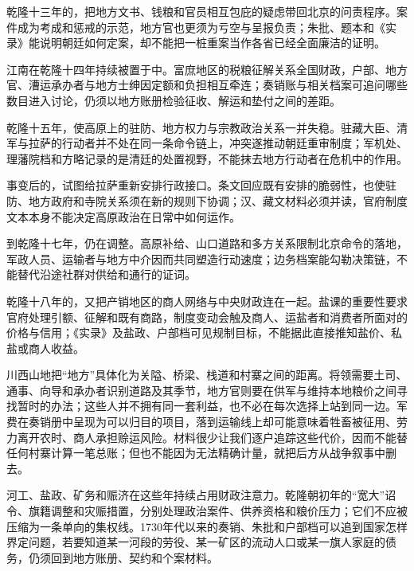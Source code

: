 乾隆十三年的，把地方文书、钱粮和官员相互包庇的疑虑带回北京的问责程序。案件成为考成和惩戒的示范，地方官也更须为亏空与呈报负责；朱批、题本和《实录》能说明朝廷如何定案，却不能把一桩重案当作各省已经全面廉洁的证明。

江南在乾隆十四年持续被置于中。富庶地区的税粮征解关系全国财政，户部、地方官、漕运承办者与地方士绅因定额和负担相互牵连；奏销账与相关档案可追问哪些数目进入讨论，仍须以地方账册检验征收、解运和垫付之间的差距。

乾隆十五年，使高原上的驻防、地方权力与宗教政治关系一并失稳。驻藏大臣、清军与拉萨的行动者并不处在同一条命令链上，冲突遂推动朝廷重审制度；军机处、理藩院档和方略记录的是清廷的处置视野，不能抹去地方行动者在危机中的作用。

事变后的，试图给拉萨重新安排行政接口。条文回应既有安排的脆弱性，也使驻防、地方政府和寺院关系须在新的规则下协调；汉、藏文材料必须并读，官府制度文本本身不能决定高原政治在日常中如何运作。

到乾隆十七年，仍在调整。高原补给、山口道路和多方关系限制北京命令的落地，军政人员、运输者与地方中介因而共同塑造行动速度；边务档案能勾勒决策链，不能替代沿途社群对供给和通行的证词。

乾隆十八年的，又把产销地区的商人网络与中央财政连在一起。盐课的重要性要求官府处理引额、征解和既有商路，制度变动会触及商人、运盐者和消费者所面对的价格与信用；《实录》及盐政、户部档可见规制目标，不能据此直接推知盐价、私盐或商人收益。

川西山地把“地方”具体化为关隘、桥梁、栈道和村寨之间的距离。将领需要土司、通事、向导和承办者识别道路及其季节，地方官则要在供军与维持本地粮价之间寻找暂时的办法；这些人并不拥有同一套利益，也不必在每次选择上站到同一边。军费在奏销册中呈现为可以归目的项目，落到运输线上却可能意味着牲畜被征用、劳力离开农时、商人承担赊运风险。材料很少让我们逐户追踪这些代价，因而不能替任何村寨计算一笔总账；但也不能因为无法精确计量，就把后方从战争叙事中删去。

河工、盐政、矿务和赈济在这些年持续占用财政注意力。乾隆朝初年的“宽大”诏令、旗籍调整和灾赈措置，分别处理政治案件、供养资格和粮价压力；它们不应被压缩为一条单向的集权线。1730年代以来的奏销、朱批和户部档可以追到国家怎样界定问题，若要知道某一河段的劳役、某一矿区的流动人口或某一旗人家庭的债务，仍须回到地方账册、契约和个案材料。

